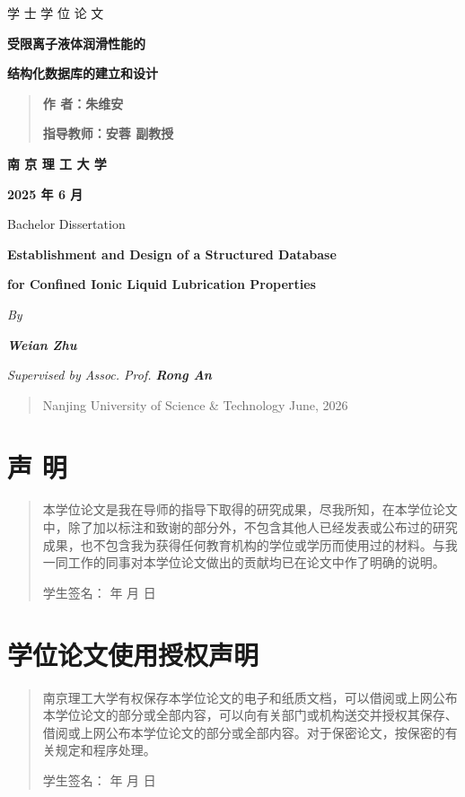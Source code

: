 学 士 学 位 论 文

\textbf{受限离子液体润滑性能的}

\textbf{结构化数据库的建立和设计}

\begin{quote}
\textbf{作 者：朱维安}

\textbf{指导教师：安蓉 副教授}
\end{quote}

\textbf{南 京 理 工 大 学}

\textbf{2025 年 6 月}

Bachelor Dissertation

\textbf{Establishment and Design of a Structured Database}

\textbf{for Confined Ionic Liquid Lubrication Properties}

\emph{By}

\emph{\textbf{Weian Zhu}}

\emph{Supervised by Assoc. Prof. \textbf{Rong An}}

\begin{quote}
Nanjing University of Science \& Technology June, 2026
\end{quote}

\hypertarget{ux58f0-ux660e}{%
\section{声 明}\label{ux58f0-ux660e}}

\begin{quote}
本学位论文是我在导师的指导下取得的研究成果，尽我所知，在本学位论文中，除了加以标注和致谢的部分外，不包含其他人已经发表或公布过的研究成果，也不包含我为获得任何教育机构的学位或学历而使用过的材料。与我一同工作的同事对本学位论文做出的贡献均已在论文中作了明确的说明。

学生签名： 年 月 日
\end{quote}

\hypertarget{ux5b66ux4f4dux8bbaux6587ux4f7fux7528ux6388ux6743ux58f0ux660e}{%
\section{学位论文使用授权声明}\label{ux5b66ux4f4dux8bbaux6587ux4f7fux7528ux6388ux6743ux58f0ux660e}}

\begin{quote}
南京理工大学有权保存本学位论文的电子和纸质文档，可以借阅或上网公布本学位论文的部分或全部内容，可以向有关部门或机构送交并授权其保存、借阅或上网公布本学位论文的部分或全部内容。对于保密论文，按保密的有关规定和程序处理。

学生签名： 年 月 日
\end{quote}

